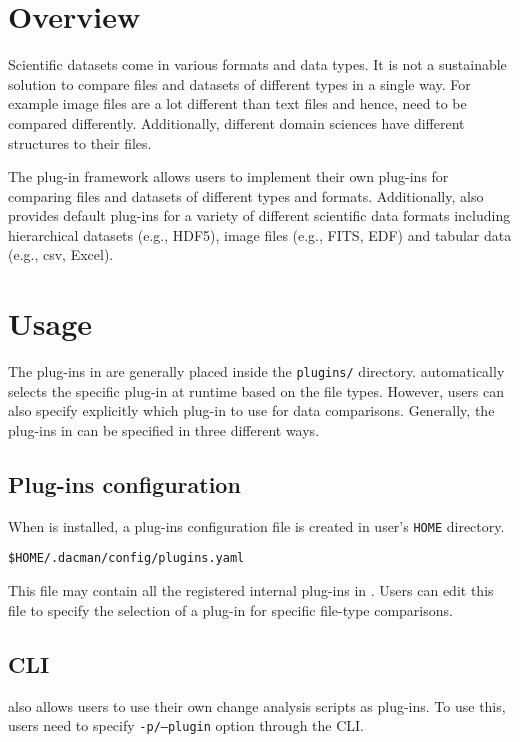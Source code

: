 \section{Overview}
Scientific datasets come in various formats and data types. It is
not a sustainable solution to compare files and datasets of different
types in a single way. For example image files are a lot different
than text files and hence, need to be compared differently. Additionally,
different domain sciences have different structures to their files.

The \systemname plug-in framework allows users to implement their
own plug-ins for comparing files and datasets of different types
and formats. Additionally, \systemname also provides default plug-ins
for a variety of different scientific data formats including hierarchical
datasets (e.g., HDF5), image files (e.g., FITS, EDF) and tabular data
(e.g., csv, Excel).

\section{Usage}
The plug-ins in \systemname are generally placed inside the \texttt{plugins/}
directory. \systemname automatically selects the specific plug-in at runtime
based on the file types. However, users can also specify explicitly which
plug-in to use for data comparisons. Generally, the plug-ins in \systemname
can be specified in three different ways.

\subsection{Plug-ins configuration}
When \systemname is installed, a plug-ins configuration file is created 
in user's \texttt{HOME} directory.

\texttt{\$HOME/.dacman/config/plugins.yaml}

This file may contain all the registered internal plug-ins in \systemname.
Users can edit this file to specify the selection of a plug-in for specific
file-type comparisons.

\subsection{CLI}
\systemname also allows users to use their own change analysis scripts as
plug-ins. To use this, users need to specify \texttt{-p/--plugin} option
through the \systemname CLI.


